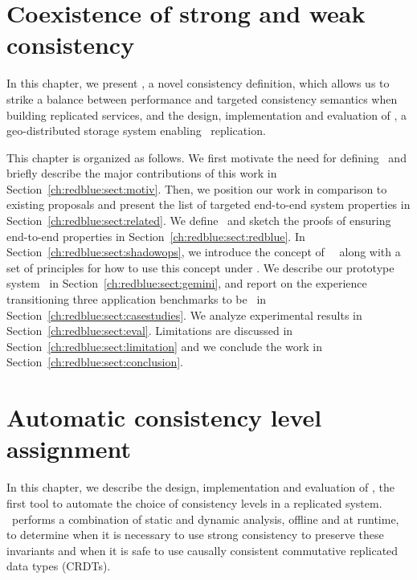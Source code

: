 \chapter{Coexistence of strong and weak consistency}
\label{chapter:redblue}
In this chapter, we present \RBCN, a novel consistency definition, which allows us to strike
a balance between performance and targeted consistency semantics when building
replicated services, and the design, implementation and evaluation of \gemini,
a geo-distributed storage system enabling \RBCAJ\ replication.

This chapter is organized as follows. We first motivate the need for defining
\RBCN\ and briefly describe the major contributions of this work in Section~\ref{ch:redblue:sect:motiv}. Then, 
we position our work in comparison to existing proposals and present the list of targeted end-to-end
system properties in Section~\ref{ch:redblue:sect:related}.
We define \RBCN\ and sketch the proofs of ensuring end-to-end properties in Section~\ref{ch:redblue:sect:redblue}. 
In Section~\ref{ch:redblue:sect:shadowops}, we introduce the concept of \shadow\ \operations\ along with a set of
principles for how to use this concept under \RBCN. We describe our prototype system
\gemini\ in Section~\ref{ch:redblue:sect:gemini}, and report on the experience
transitioning three application benchmarks to be \RBCAJ\ in
Section~\ref{ch:redblue:sect:casestudies}. We analyze experimental results in
Section~\ref{ch:redblue:sect:eval}. Limitations are discussed in
Section~\ref{ch:redblue:sect:limitation} and we conclude the work in Section~\ref{ch:redblue:sect:conclusion}.










\chapter{Automatic consistency level assignment}
\label{chapter:sieve}
In this chapter, we describe the design, implementation and evaluation of \tool, the first tool to automate
the choice of consistency levels in a replicated system. \tool\ performs a combination of static and
dynamic analysis, offline and at runtime, to determine
when it is necessary to use strong consistency to preserve
these invariants and when it is safe to use causally consistent
commutative replicated data types (CRDTs).

